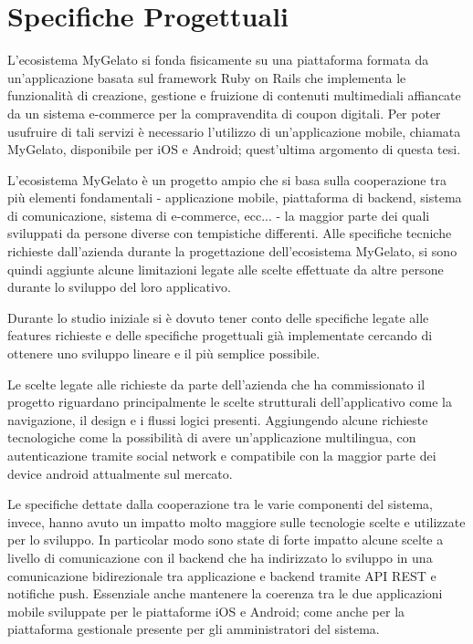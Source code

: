 \section{Specifiche Progettuali}



L'ecosistema MyGelato si fonda fisicamente su una piattaforma formata da un’applicazione basata sul framework Ruby on Rails che implementa le funzionalità di creazione, gestione e fruizione di contenuti multimediali affiancate da un sistema e-commerce per la compravendita di coupon digitali.
Per poter usufruire di tali servizi è necessario l'utilizzo di un'applicazione mobile, chiamata MyGelato, disponibile per iOS e Android; quest'ultima argomento di questa tesi.


L'ecosistema MyGelato è un progetto ampio che si basa sulla cooperazione tra più elementi fondamentali - applicazione mobile, piattaforma di backend, sistema di comunicazione, sistema di e-commerce, ecc... - la maggior parte dei quali sviluppati da persone diverse con tempistiche differenti.
Alle specifiche tecniche richieste dall'azienda durante la progettazione dell'ecosistema MyGelato, si sono quindi aggiunte alcune limitazioni legate alle scelte effettuate da altre persone durante lo sviluppo del loro applicativo.

Durante lo studio iniziale si è dovuto tener conto delle specifiche legate alle features richieste e delle specifiche progettuali già implementate cercando di ottenere uno sviluppo lineare e il più semplice possibile.

Le scelte legate alle richieste da parte dell'azienda che ha commissionato il progetto riguardano principalmente le scelte strutturali dell'applicativo come la navigazione, il design e i flussi logici presenti.
Aggiungendo alcune richieste tecnologiche come la possibilità di avere un'applicazione multilingua, con autenticazione tramite social network e compatibile con la maggior parte dei device android attualmente sul mercato.

Le specifiche dettate dalla cooperazione tra le varie componenti del sistema, invece, hanno avuto un impatto molto maggiore sulle tecnologie scelte e utilizzate per lo sviluppo.
In particolar modo sono state di forte impatto alcune scelte a livello di comunicazione con il backend che ha indirizzato lo sviluppo in una comunicazione bidirezionale tra applicazione e backend tramite API REST e notifiche push.
Essenziale anche mantenere la coerenza tra le due applicazioni mobile sviluppate per le piattaforme iOS e Android; come anche per la piattaforma gestionale presente per gli amministratori del sistema.

